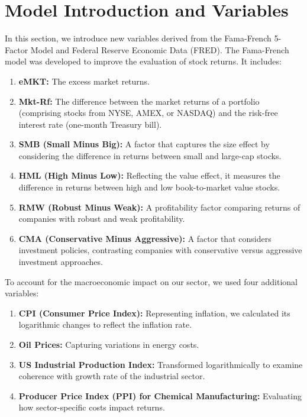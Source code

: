 \section{Model Introduction and Variables}

In this section, we introduce new variables derived from the Fama-French 5-Factor Model and Federal Reserve Economic Data 
(FRED). 
The Fama-French model was developed to improve the evaluation of stock returns.
 It includes:
\begin{enumerate}
    \item \textbf{eMKT:} The excess market returns.
    \item \textbf{Mkt-Rf:} The difference between the market returns of a portfolio (comprising stocks from NYSE, AMEX, or
    NASDAQ) and the risk-free interest rate (one-month Treasury bill).
    \item \textbf{SMB (Small Minus Big):} A factor that captures the size effect by considering the difference in returns
    between small and large-cap stocks.
    \item \textbf{HML (High Minus Low):} Reflecting the value effect, it measures the difference in returns between high and
    low book-to-market value stocks.
    \item \textbf{RMW (Robust Minus Weak):} A profitability factor comparing returns of companies with robust and weak 
    profitability.
    \item \textbf{CMA (Conservative Minus Aggressive):} A factor that considers investment policies, contrasting companies 
    with conservative versus aggressive investment approaches.
\end{enumerate}

To account for the macroeconomic impact on our sector, we used four additional variables:

\begin{enumerate}[resume*]
    \item \textbf{CPI (Consumer Price Index):} Representing inflation, we calculated its logarithmic changes to reflect the inflation rate.
    \item \textbf{Oil Prices:} Capturing variations in energy costs.
    \item \textbf{US Industrial Production Index:} Transformed logarithmically to examine coherence with growth rate of the
    industrial sector.
    \item \textbf{Producer Price Index (PPI) for Chemical Manufacturing:} Evaluating how sector-specific costs impact returns.
\end{enumerate}

